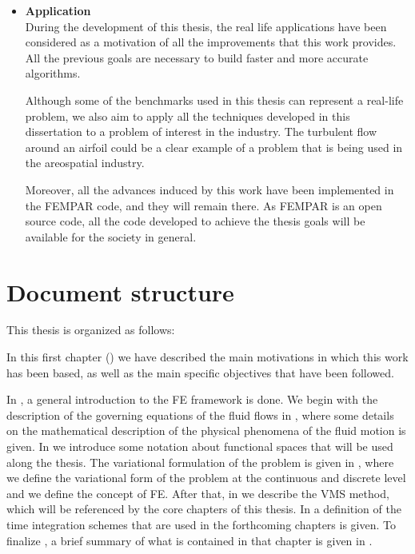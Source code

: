 \begin{itemize}
\item {\bf Application}\\
During the development of this thesis, the real life applications have been considered as a motivation of all the improvements that this work provides. All the previous goals are necessary to build faster and more accurate algorithms.

Although some of the benchmarks used in this thesis can represent a real-life problem, we also aim to apply all the techniques developed in this dissertation to a problem of interest in the industry. The turbulent flow around an airfoil could be a clear example of a problem that is being used in the areospatial industry.

Moreover, all the advances induced by this work have been implemented in the FEMPAR code, and they will remain there. As FEMPAR is an open source code, all the code developed to achieve the thesis goals will be available for the society in general.


\end{itemize}

\section{Document structure}

This thesis is organized as follows:

In this first chapter () we have described the main motivations in which this work has been based, as well as the main specific objectives that have been followed.

In , a general introduction to the FE framework is done. We begin with the description of the governing equations of the fluid flows in , where some details on the mathematical description of the physical phenomena of the fluid motion is given. In  we introduce some notation about functional spaces that will be used along the thesis. The variational formulation of the problem is given in , where we define the variational form of the problem at the continuous and discrete level and we define the concept of FE. After that, in  we describe the VMS method, which will be referenced by the core chapters of this thesis. In  a definition of the time integration schemes that are used in the forthcoming chapters is given. To finalize , a brief summary of what is contained in that chapter is given in .


